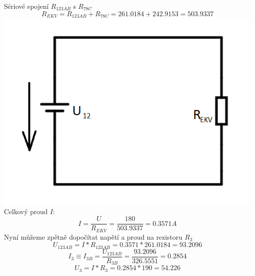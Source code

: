 \documentclass[11pt]{article}
\begin{document}
Sériové spojení $R_{123AB}$ s $R_{78C}$
$$R_{EKV} = R_{123AB} + R_{78C} = 261.0184 + 242.9153 = 503.9337$$
\includegraphics[width=0.8\linewidth]{priklad1_zjednoduseni3.png}\\
Celkový proud $I$:
$$I = \frac{U}{R_{EKV}} = \frac{180}{503.9337} = 0.3571A$$
Nyní můžeme zpětně dopočítat napětí a proud na rezistoru $R_3$
$$U_{123AB} = I * R_{123AB} = 0.3571 * 261.0184 = 93.2096$$
$$I_3 \equiv I_{3B} = \frac{U_{123AB}}{R_{3   B}} = \frac{93.2096}{326.5551} = 0.2854$$
$$U_3 = I * R_3 = 0.2854 * 190 = 54.226$$
\newpage
\end{document}
